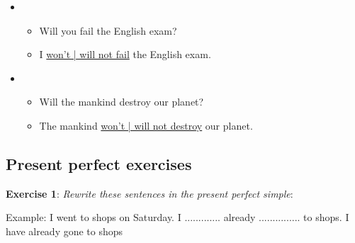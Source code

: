 \begin{itemize}
\item
\begin{itemize}
\item Will you fail the English exam?
\item I \underline{won't | will not fail} the English exam.
\end{itemize}

\item
\begin{itemize}
\item Will the mankind destroy our planet?
\item The mankind \underline{won't | will not destroy} our planet.
\end{itemize}

\end{itemize}

\subsection{Present perfect exercises}

\textbf{Exercise 1}: \textit{Rewrite these sentences in the present perfect simple}:

Example:
I went to shops on Saturday. 
I ............. already ............... to shops.
I have already gone to shops

